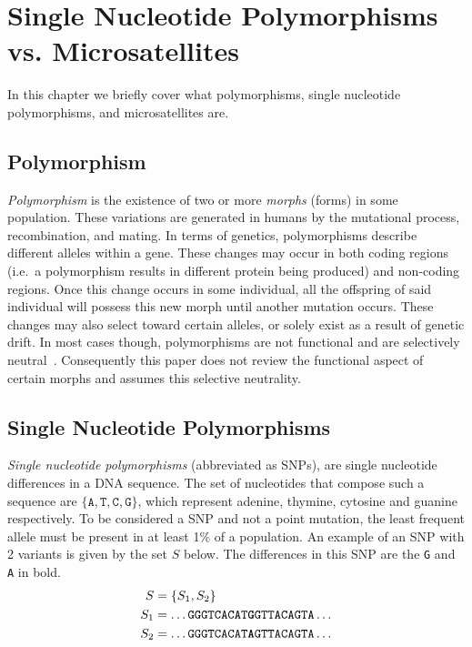 \chapter{Single Nucleotide Polymorphisms vs. Microsatellites}\label{ch:SNPvsMicrosatellites}
In this chapter we briefly cover what polymorphisms, single nucleotide polymorphisms, and microsatellites are.

\section{Polymorphism}\label{sec:polymorphism}
\emph{Polymorphism} is the existence of two or more \emph{morphs} (forms) in some population.
These variations are generated in humans by the mutational process, recombination, and mating.
In terms of genetics, polymorphisms describe different alleles within a gene.
These changes may occur in both coding regions (i.e.\ a polymorphism results in different protein being produced) and
non-coding regions.
Once this change occurs in some individual, all the offspring of said individual will possess this new morph until
another mutation occurs.
These changes may also select toward certain alleles, or solely exist as a result of genetic drift.
In most cases though, polymorphisms are not functional and are selectively
neutral~\cite{wrightGeneticVariationPolymorphisms2005}.
Consequently this paper does not review the functional aspect of certain morphs and assumes this selective neutrality.

\section{Single Nucleotide Polymorphisms}\label{sec:singleNucleotidePolymorphism}
\emph{Single nucleotide polymorphisms} (abbreviated as SNPs), are single nucleotide differences in a DNA sequence.
The set of nucleotides that compose such a sequence are $\{ \texttt{A}, \texttt{T}, \texttt{C}, \texttt{G} \}$, which
represent adenine, thymine, cytosine and guanine respectively.
To be considered a SNP and not a point mutation, the least frequent allele must be present in at least 1\% of a
population.
An example of an SNP with 2 variants is given by the set $S$ below.
The differences in this SNP are the \texttt{G} and \texttt{A} in bold.
\begin{align*}
    S &= \{ S_1, S_2 \} \\
    S_1 &= \ldots \texttt{GGGTCACAT\textbf{G}GTTACAGTA} \ldots \\
    S_2 &= \ldots \texttt{GGGTCACAT\textbf{A}GTTACAGTA} \ldots
\end{align*}

